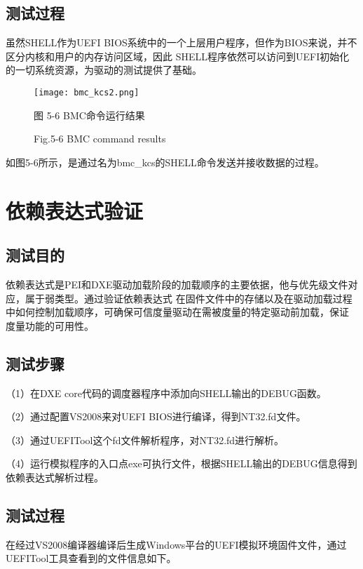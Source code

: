 \subsection{测试过程}
虽然SHELL作为UEFI BIOS系统中的一个上层用户程序，但作为BIOS来说，并不区分内核和用户的内存访问区域，因此
SHELL程序依然可以访问到UEFI初始化的一切系统资源，为驱动的测试提供了基础。

\begin{figure}[H]
    \vspace{0cm}   
    \setlength{\abovecaptionskip}{0.3cm}
	\centering
    \texttt{[image: bmc\_kcs2.png]}
    \caption*{图 5-6 BMC命令运行结果}
    \setlength{\belowcaptionskip}{-0.7cm}
    \caption*{Fig.5-6 BMC command results}
\end{figure}

如图5-6所示，是通过名为bmc\_kcs的SHELL命令发送并接收数据的过程。


%
%
\section{依赖表达式验证}

\subsection{测试目的}
依赖表达式是PEI和DXE驱动加载阶段的加载顺序的主要依据，他与优先级文件对应，属于弱类型。通过验证依赖表达式
在固件文件中的存储以及在驱动加载过程中如何控制加载顺序，可确保可信度量驱动在需被度量的特定驱动前加载，保证
度量功能的可用性。

\subsection{测试步骤}
（1）在DXE core代码的调度器程序中添加向SHELL输出的DEBUG函数。
\par （2）通过配置VS2008来对UEFI BIOS进行编译，得到NT32.fd文件。
\par （3）通过UEFITool这个fd文件解析程序，对NT32.fd进行解析。
\par （4）运行模拟程序的入口点exe可执行文件，根据SHELL输出的DEBUG信息得到依赖表达式解析过程。

\subsection{测试过程}
在经过VS2008编译器编译后生成Windows平台的UEFI模拟环境固件文件，通过UEFITool工具查看到的文件信息如下。

